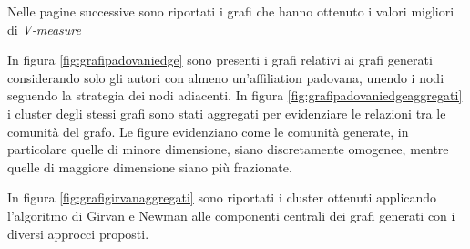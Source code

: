 \documentclass[12pt,a4paper,twoside]{report}
\begin{document}

Nelle pagine successive sono riportati i grafi che hanno ottenuto i valori migliori di
\textit{V-measure}

In figura \ref{fig:grafipadovaniedge} sono presenti i grafi relativi ai grafi generati considerando
solo gli autori con almeno un'affiliation padovana, unendo i nodi seguendo la strategia dei nodi
adiacenti. In figura \ref{fig:grafipadovaniedgeaggregati} i cluster degli stessi grafi sono stati
aggregati per evidenziare le relazioni tra le comunità del grafo. Le figure evidenziano come le
comunità generate, in particolare quelle di minore dimensione, siano discretamente omogenee, mentre
quelle di maggiore dimensione siano più frazionate.


In figura \ref{fig:grafigirvanaggregati} sono riportati i cluster ottenuti applicando l'algoritmo di
Girvan e Newman alle componenti centrali dei grafi generati con i diversi approcci proposti.
\end{document}
